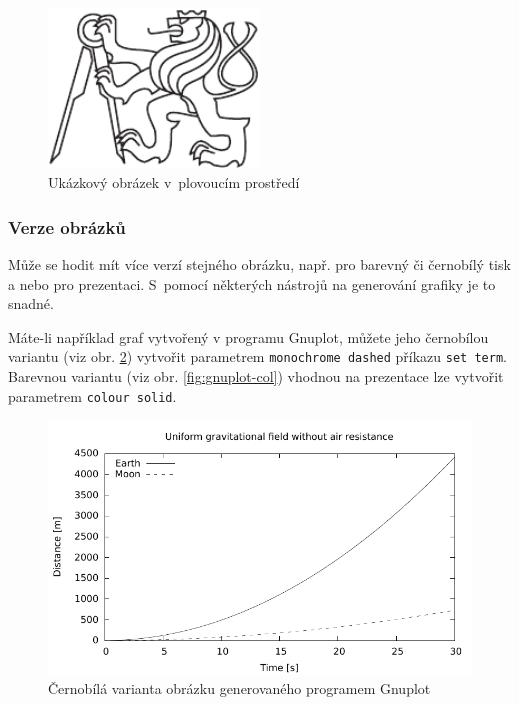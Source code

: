 \documentclass[thesis=B,czech]{FITthesis}[2011/06/14]
\begin{document}
 \begin{figure}\centering
 	\includegraphics[width=0.5\textwidth, angle=30]{cvut-logo-bw}
 	\caption[Příklad obrázku]{Ukázkový obrázek v~plovoucím prostředí}\label{fig:float}
 \end{figure}
 
 \subsubsection{Verze obrázků}
 
 Může se hodit mít více verzí stejného obrázku, např. pro barevný či černobílý tisk a nebo pro prezentaci. S~pomocí některých nástrojů na generování grafiky je to snadné.
 
 Máte-li například graf vytvořený v programu Gnuplot, můžete jeho černobílou variantu (viz obr. \ref{fig:gnuplot-bw}) vytvořit parametrem \verb|monochrome dashed| příkazu \verb|set term|. Barevnou variantu (viz obr. \ref{fig:gnuplot-col}) vhodnou na prezentace lze vytvořit parametrem \verb|colour solid|.
 
 \begin{figure}\centering
 	\includegraphics{gnuplot-bw}
 	\caption{Černobílá varianta obrázku generovaného programem Gnuplot}\label{fig:gnuplot-bw}
 \end{figure}
 
\end{document}
